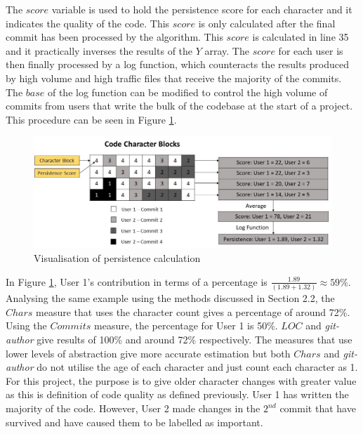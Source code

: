 The $score$ variable is used to hold the persistence score for each character and it indicates the quality of the code. This $score$ is only calculated after the final commit has been processed by the algorithm. This $score$ is calculated in line 35 and it practically inverses the results of the $Y$ array. The $score$ for each user is then finally processed by a log function, which counteracts the results produced by high volume and high traffic files that receive the majority of the commits. The $base$ of the log function can be modified to control the high volume of commits from users that write the bulk of the codebase at the start of a project. This procedure can be seen in Figure \ref{fig:6}. 
\begin{figure}[ht]
    \centering
    \includegraphics[scale=0.5]{images/persistence_calc.jpg}
    \caption{Visualisation of persistence calculation}
    \label{fig:6}
\end{figure}

In Figure \ref{fig:6}, User 1's contribution in terms of a percentage is $\frac{1.89}{(1.89+1.32)} \approx 59\%$. Analysing the same example using the methods discussed in Section 2.2, the $Chars$ measure that uses the character count gives a percentage of around 72\%. Using the $Commits$ measure, the percentage for User 1 is 50\%. $LOC$ and \textit{git-author} give results of 100\% and around 72\% respectively. The measures that use lower levels of abstraction give more accurate estimation but both $Chars$ and \textit{git-author} do not utilise the age of each character and just count each character as 1. For this project, the purpose is to give older character changes with greater value as this is definition of code quality as defined previously. User 1 has written the majority of the code. However, User 2 made changes in the $2^{nd}$ commit that have survived and have caused them to be labelled as important. 